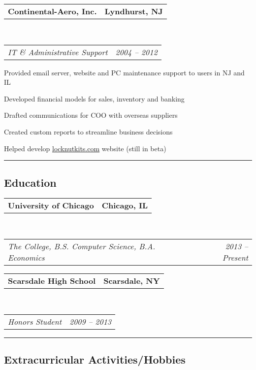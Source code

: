 \documentclass[10pt,letterpaper]{article}
\makeatletter
\newcommand{\headerrow}[2]
{\noindent \begin{tabular*}{\linewidth}{l@{\extracolsep{\fill}}r}
	#1 &
	#2 \\
\end{tabular*}}
\newcommand{\ahref}[1]
{\href{http://#1}{#1}}
\makeatother
\begin{document}
	\headerrow
		{\textbf{Continental-Aero, Inc.}}
		{\textbf{Lyndhurst, NJ}}
	\\
	\headerrow
		{\emph{IT \& Administrative Support}}
		{\emph{2004 -- 2012}}
	\begin{itemize*}
		\item Provided email server, website and PC maintenance support to users in NJ and IL
		\item Developed financial models for sales, inventory and banking
		\item Drafted communications for COO with overseas suppliers
		\item Created custom reports to streamline business decisions
		\item Helped develop \ahref{locknutkits.com} website (still in beta)
	\end{itemize*}


\vspace{0.4em}
\hrule
\vspace{-0.4em}
\subsection*{Education}

	\headerrow
		{\textbf{University of Chicago}}
		{\textbf{Chicago, IL}}
	\\
	\headerrow
		{\emph{The College, B.S. Computer Science, B.A. Economics}}
		{\emph{2013 -- Present}}

	\headerrow
		{\textbf{Scarsdale High School}}
		{\textbf{Scarsdale, NY}}
	\\
	\headerrow
		{\emph{Honors Student}}
		{\emph{2009 -- 2013}}

\vspace{0.8em}
\hrule
\vspace{-0.4em}
\subsection*{Extracurricular Activities/Hobbies}
\end{document}
